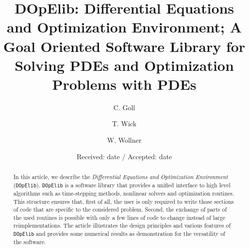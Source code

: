 \documentclass[smallextended]{svjour3}       %
\numberwithin{equation}{section}
\newcommand{\dope}{\texttt{DOpElib}}
\begin{document}
\title{DOpElib: Differential Equations and Optimization Environment; A Goal Oriented Software Library for Solving PDEs and Optimization Problems with PDEs}



\author{C. Goll \and T. Wick \and W. Wollner}



\date{Received: date / Accepted: date}


\maketitle

\begin{abstract}
In this article, we describe the  
\textit{Differential Equations and Optimization Environment} (\dope{}).
\dope{} is a software library that provides a unified interface 
to high level algorithms such as time-stepping methods, nonlinear solvers and 
optimization routines. This structure ensures 
that, first of all, the user is only required to write those sections of code 
that are specific to 
the considered problem. Second, the exchange of parts of the used routines is possible 
with only a few lines of code to change instead of large reimplementations.
The article illustrates the design principles and various features
of \dope{} and provides some 
numerical results as demonstration for the versatility of the software.

\end{abstract}
\end{document}
